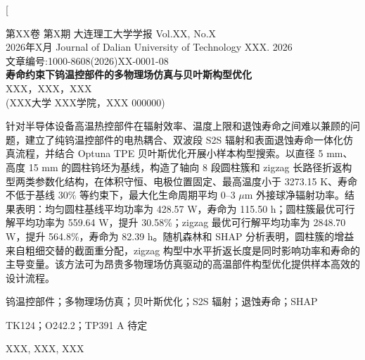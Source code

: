 \documentclass[10pt,twocolumn]{ctexart}
\begin{document}
\twocolumn[
\begin{@twocolumnfalse}
\begin{center}
{ 第XX卷 第X期 \hfill 大连理工大学学报 \hfill Vol.XX, No.X}\\
{ 2026年X月 \hfill Journal of Dalian University of Technology \hfill XXX. 2026}\\
\vspace{1mm}
{ 文章编号:1000-8608(2026)XX-0001-08}\\
\vspace{4mm}
{\bfseries 寿命约束下钨温控部件的多物理场仿真与贝叶斯构型优化}\\
\vspace{3mm}
{ XXX，XXX，XXX}\\
\vspace{1mm}
{(XXX大学 XXX学院，XXX 000000)}
\end{center}

 针对半导体设备高温热控部件在辐射效率、温度上限和退蚀寿命之间难以兼顾的问题，建立了纯钨温控部件的电热耦合、双波段 S2S 辐射和表面退蚀寿命一体化仿真流程，并结合 Optuna TPE 贝叶斯优化开展小样本构型搜索。以直径 5 mm、高度 15 mm 的圆柱钨坯为基线，构造了轴向 8 段圆柱簇和 zigzag 长路径折返构型两类参数化结构，在体积守恒、电极位置固定、最高温度小于 3273.15 K、寿命不低于基线 30\% 等约束下，最大化生命周期平均 0--3 $\mu$m 外接球净辐射功率。结果表明：均匀圆柱基线平均功率为 428.57 W，寿命为 115.50 h；圆柱簇最优可行解平均功率为 559.64 W，提升 30.58\%；zigzag 最优可行解平均功率为 2848.70 W，提升 564.8\%，寿命为 82.39 h。随机森林和 SHAP 分析表明，圆柱簇的增益来自粗细交替的截面重分配，zigzag 构型中水平折返长度是同时影响功率和寿命的主导变量。该方法可为昂贵多物理场仿真驱动的高温部件构型优化提供样本高效的设计流程。

\vspace{1mm}
 钨温控部件；多物理场仿真；贝叶斯优化；S2S 辐射；退蚀寿命；SHAP

\vspace{1mm}
 TK124；O242.2；TP391  A  待定

\vspace{2mm}

\noindent XXX, XXX, XXX


\end{@twocolumnfalse}
\end{document}
